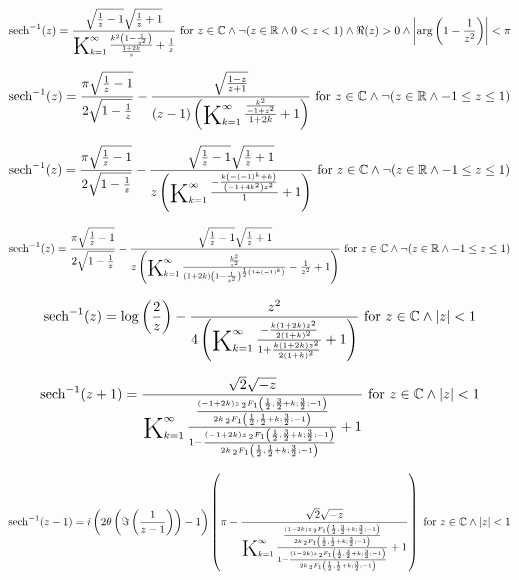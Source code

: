 \documentclass{article}
\newcommand{\bigK}{\mathop{\raisebox{-5pt}{\huge K}}}
\begin{document}
\[\text{sech}^{-1}(z)=\frac{\sqrt{\frac{1}{z}-1} \sqrt{\frac{1}{z}+1}}{\bigK_{k=1}^{\infty}\frac{k^2 \left(1-\frac{1}{z^2}\right)}{\frac{1+2 k}{z}}+\frac{1}{z}}\text{ for }z\in \mathbb{C}\land \neg (z\in \mathbb{R}\land 0<z<1)\land \Re(z)>0\land \left| \arg \left(1-\frac{1}{z^2}\right)\right| <\pi\] 

\[\text{sech}^{-1}(z)=\frac{\pi  \sqrt{\frac{1}{z}-1}}{2 \sqrt{1-\frac{1}{z}}}-\frac{\sqrt{\frac{1-z}{z+1}}}{(z-1) \left(\bigK_{k=1}^{\infty}\frac{\frac{k^2}{-1+z^2}}{1+2 k}+1\right)}\text{ for }z\in \mathbb{C}\land \neg (z\in \mathbb{R}\land -1\leq z\leq 1)\] 

\[\text{sech}^{-1}(z)=\frac{\pi  \sqrt{\frac{1}{z}-1}}{2 \sqrt{1-\frac{1}{z}}}-\frac{\sqrt{\frac{1}{z}-1} \sqrt{\frac{1}{z}+1}}{z \left(\bigK_{k=1}^{\infty}\frac{-\frac{k \left(-(-1)^k+k\right)}{\left(-1+4 k^2\right) z^2}}{1}+1\right)}\text{ for }z\in \mathbb{C}\land \neg (z\in \mathbb{R}\land -1\leq z\leq 1)\] 

\[\text{sech}^{-1}(z)=\frac{\pi  \sqrt{\frac{1}{z}-1}}{2 \sqrt{1-\frac{1}{z}}}-\frac{\sqrt{\frac{1}{z}-1} \sqrt{\frac{1}{z}+1}}{z \left(\bigK_{k=1}^{\infty}\frac{\frac{k^2}{z^2}}{(1+2 k) \left(1-\frac{1}{z^2}\right)^{\frac{1}{2} \left(1+(-1)^k\right)}}-\frac{1}{z^2}+1\right)}\text{ for }z\in \mathbb{C}\land \neg (z\in \mathbb{R}\land -1\leq z\leq 1)\] 

\[\text{sech}^{-1}(z)=\log \left(\frac{2}{z}\right)-\frac{z^2}{4 \left(\bigK_{k=1}^{\infty}\frac{-\frac{k (1+2 k) z^2}{2 (1+k)^2}}{1+\frac{k (1+2 k) z^2}{2 (1+k)^2}}+1\right)}\text{ for }z\in \mathbb{C}\land \left| z\right| <1\] 

\[\text{sech}^{-1}(z+1)=\frac{\sqrt{2} \sqrt{-z}}{\bigK_{k=1}^{\infty}\frac{\frac{(-1+2 k) z \, _2F_1\left(\frac{1}{2},\frac{3}{2}+k;\frac{3}{2};-1\right)}{2 k \, _2F_1\left(\frac{1}{2},\frac{1}{2}+k;\frac{3}{2};-1\right)}}{1-\frac{(-1+2 k) z \, _2F_1\left(\frac{1}{2},\frac{3}{2}+k;\frac{3}{2};-1\right)}{2 k \, _2F_1\left(\frac{1}{2},\frac{1}{2}+k;\frac{3}{2};-1\right)}}+1}\text{ for }z\in \mathbb{C}\land \left| z\right| <1\] 

\[\text{sech}^{-1}(z-1)=i \left(2 \theta \left(\Im\left(\frac{1}{z-1}\right)\right)-1\right) \left(\pi -\frac{\sqrt{2} \sqrt{-z}}{\bigK_{k=1}^{\infty}\frac{\frac{(1-2 k) z \, _2F_1\left(\frac{1}{2},\frac{3}{2}+k;\frac{3}{2};-1\right)}{2 k \, _2F_1\left(\frac{1}{2},\frac{1}{2}+k;\frac{3}{2};-1\right)}}{1-\frac{(1-2 k) z \, _2F_1\left(\frac{1}{2},\frac{3}{2}+k;\frac{3}{2};-1\right)}{2 k \, _2F_1\left(\frac{1}{2},\frac{1}{2}+k;\frac{3}{2};-1\right)}}+1}\right)\text{ for }z\in \mathbb{C}\land \left| z\right| <1\] 
\end{document}
